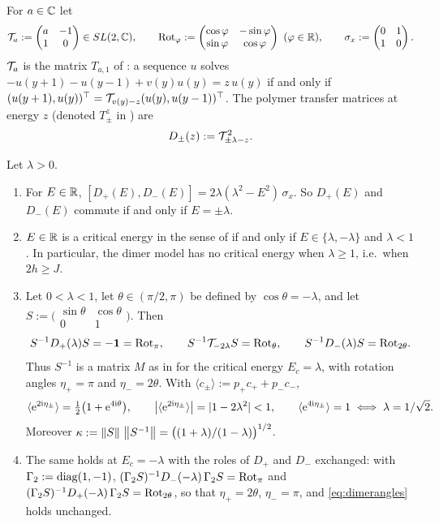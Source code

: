 For $a\in\mathbb{C}$ let
\[
  \Tdim_a:=\begin{pmatrix}a&-1\\1&0\end{pmatrix}\in SL(2,\C),\qquad
  \Rot_\varphi:=\begin{pmatrix}\cos\varphi&-\sin\varphi\\\sin\varphi&\cos\varphi\end{pmatrix}\ (\varphi\in\R),\qquad
  \sigma_x:=\begin{pmatrix}0&1\\1&0\end{pmatrix}.
\]
$\mathcal{T}_a$ is the matrix $T_{a,1}$ of \cite[Eq.~(3)]{JSBS2003}: a sequence $u$ solves
$-u(y+1)-u(y-1)+v(y)u(y)=z\,u(y)$ if and only if
$(u(y+1),u(y))^\top=\mathcal{T}_{v(y)-z}(u(y),u(y-1))^\top$.  The polymer transfer matrices at energy $z$
(denoted $T^z_\pm$ in \cite{JSBS2003}) are
\[
  D_\pm(z):=\mathcal{T}_{\pm\lambda-z}^2 .
\]

\begin{lemma}\label{lem:dimercritical}
Let $\lambda>0$.
\begin{enumerate}[label=(\roman*)]
\item For $E\in\mathbb{R}$, $[D_+(E),D_-(E)]=2\lambda(\lambda^2-E^2)\,\sigma_x$.  So $D_+(E)$ and $D_-(E)$ commute if
and only if $E=\pm\lambda$.
\item $E\in\mathbb{R}$ is a critical energy in the sense of \cite[Def.~1]{JSBS2003} if and only if
$E\in\{\lambda,-\lambda\}$ and $\lambda<1$.  In particular, the dimer model has no critical energy when
$\lambda\ge1$, i.e.\ when $2h\ge J$.
\item Let $0<\lambda<1$, let $\theta\in(\pi/2,\pi)$ be defined by $\cos\theta=-\lambda$, and let
$S:=\bigl(\begin{smallmatrix}\sin\theta&\cos\theta\\0&1\end{smallmatrix}\bigr)$.  Then
\begin{equation}\label{eq:dimerrot}
  S^{-1}D_+(\lambda)S=-\mathbf{1}=\mathrm{Rot}_\pi,\qquad S^{-1}\mathcal{T}_{-2\lambda}S=\mathrm{Rot}_\theta,\qquad S^{-1}D_-(\lambda)S=\mathrm{Rot}_{2\theta}.
\end{equation}
Thus $S^{-1}$ is a matrix $M$ as in \cite[Eq.~(7)]{JSBS2003} for the critical energy $E_c=\lambda$, with
rotation angles $\eta_+=\pi$ and $\eta_-=2\theta$.  With $\langle c_\pm\rangle:=p_+c_++p_-c_-$,
\begin{equation}\label{eq:dimerangles}
  \langle\mathrm{e}^{2\mathrm{i}\eta_\pm}\rangle=\tfrac12\bigl(1+\mathrm{e}^{4\mathrm{i}\theta}\bigr),\qquad
  \bigl|\langle\mathrm{e}^{2\mathrm{i}\eta_\pm}\rangle\bigr|=|1-2\lambda^2|<1,\qquad
  \langle\mathrm{e}^{4\mathrm{i}\eta_\pm}\rangle=1\iff\lambda=1/\sqrt2 .
\end{equation}
Moreover $\kappa:=\left\|S\right\|\,\left\|S^{-1}\right\|=\bigl((1+\lambda)/(1-\lambda)\bigr)^{1/2}$.
\item The same holds at $E_c=-\lambda$ with the roles of $D_+$ and $D_-$ exchanged: with
$\Gamma_2:=\operatorname{diag}(1,-1)$, $(\Gamma_2S)^{-1}D_-(-\lambda)\,\Gamma_2S=\mathrm{Rot}_\pi$ and
$(\Gamma_2S)^{-1}D_+(-\lambda)\,\Gamma_2S=\mathrm{Rot}_{2\theta}$, so that $\eta_+=2\theta$, $\eta_-=\pi$, and
\eqref{eq:dimerangles} holds unchanged.
\end{enumerate}
\end{lemma}


